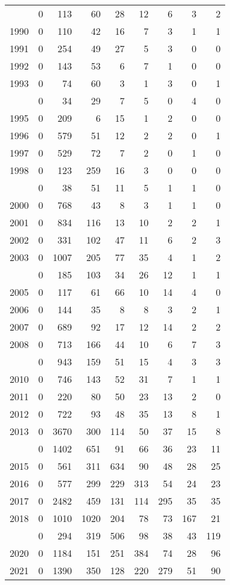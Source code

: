 \documentclass[
]{article}
\begin{document}
\begin{longtable}[t]{lrrrrrrrr}
\endfoot
\bottomrule
\endlastfoot
1989 & 0 & 113 & 60 & 28 & 12 & 6 & 3 & 2\\
1990 & 0 & 110 & 42 & 16 & 7 & 3 & 1 & 1\\
1991 & 0 & 254 & 49 & 27 & 5 & 3 & 0 & 0\\
1992 & 0 & 143 & 53 & 6 & 7 & 1 & 0 & 0\\
1993 & 0 & 74 & 60 & 3 & 1 & 3 & 0 & 1\\
\addlinespace
1994 & 0 & 34 & 29 & 7 & 5 & 0 & 4 & 0\\
1995 & 0 & 209 & 6 & 15 & 1 & 2 & 0 & 0\\
1996 & 0 & 579 & 51 & 12 & 2 & 2 & 0 & 1\\
1997 & 0 & 529 & 72 & 7 & 2 & 0 & 1 & 0\\
1998 & 0 & 123 & 259 & 16 & 3 & 0 & 0 & 0\\
\addlinespace
1999 & 0 & 38 & 51 & 11 & 5 & 1 & 1 & 0\\
2000 & 0 & 768 & 43 & 8 & 3 & 1 & 1 & 0\\
2001 & 0 & 834 & 116 & 13 & 10 & 2 & 2 & 1\\
2002 & 0 & 331 & 102 & 47 & 11 & 6 & 2 & 3\\
2003 & 0 & 1007 & 205 & 77 & 35 & 4 & 1 & 2\\
\addlinespace
2004 & 0 & 185 & 103 & 34 & 26 & 12 & 1 & 1\\
2005 & 0 & 117 & 61 & 66 & 10 & 14 & 4 & 0\\
2006 & 0 & 144 & 35 & 8 & 8 & 3 & 2 & 1\\
2007 & 0 & 689 & 92 & 17 & 12 & 14 & 2 & 2\\
2008 & 0 & 713 & 166 & 44 & 10 & 6 & 7 & 3\\
\addlinespace
2009 & 0 & 943 & 159 & 51 & 15 & 4 & 3 & 3\\
2010 & 0 & 746 & 143 & 52 & 31 & 7 & 1 & 1\\
2011 & 0 & 220 & 80 & 50 & 23 & 13 & 2 & 0\\
2012 & 0 & 722 & 93 & 48 & 35 & 13 & 8 & 1\\
2013 & 0 & 3670 & 300 & 114 & 50 & 37 & 15 & 8\\
\addlinespace
2014 & 0 & 1402 & 651 & 91 & 66 & 36 & 23 & 11\\
2015 & 0 & 561 & 311 & 634 & 90 & 48 & 28 & 25\\
2016 & 0 & 577 & 299 & 229 & 313 & 54 & 24 & 23\\
2017 & 0 & 2482 & 459 & 131 & 114 & 295 & 35 & 35\\
2018 & 0 & 1010 & 1020 & 204 & 78 & 73 & 167 & 21\\
\addlinespace
2019 & 0 & 294 & 319 & 506 & 98 & 38 & 43 & 119\\
2020 & 0 & 1184 & 151 & 251 & 384 & 74 & 28 & 96\\
2021 & 0 & 1390 & 350 & 128 & 220 & 279 & 51 & 90\\*
\end{longtable}
\end{document}
